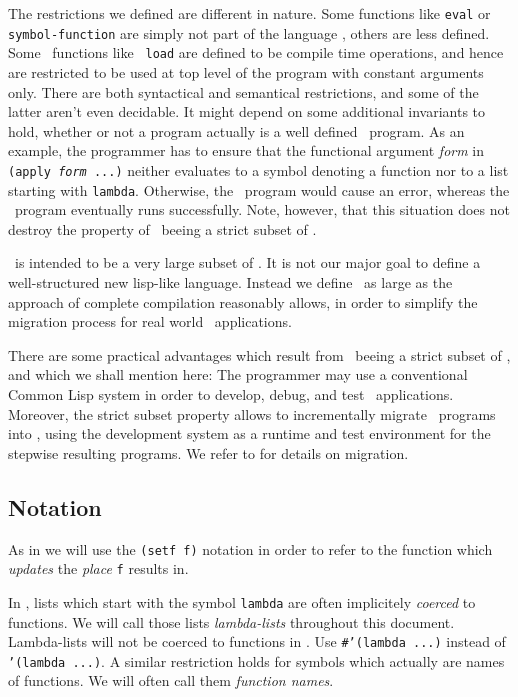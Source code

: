 The restrictions we defined are different in nature. Some functions
like {\tt eval} or {\tt symbol-function} are simply not part of the
language , others are less defined. Some \CL\ functions like {\tt
  load} are defined to be compile time operations, and hence are
restricted to be used at top level of the program with constant
arguments only. There are both syntactical and semantical
restrictions, and some of the latter aren't even decidable. It might
depend on some additional invariants to hold, whether or not a program
actually is a well defined \ program. As an example, the
programmer has to ensure that the functional argument {\it form} in
{\tt (apply {\it form} ...)} neither evaluates to a symbol denoting a
function nor to a list starting with {\tt lambda}. Otherwise, the
\ program would cause an error, whereas the \CL\ program
eventually runs successfully.  Note, however, that this situation does
not destroy the property of \ beeing a strict subset of \CL.

\ is intended to be a very large subset of \CL. It is not our
major goal to define a well-structured new lisp-like language.
Instead we define \ as large as the approach of complete
compilation reasonably allows, in order to simplify the migration
process for real world \CL\ applications.

There are some practical advantages which result from \ beeing a
strict subset of \CL, and which we shall mention here: The programmer
may use a conventional Common Lisp system in order to develop, debug,
and test \ applications. Moreover, the strict subset property
allows to incrementally migrate \CL\ programs into , using the
development system as a runtime and test environment for the stepwise
resulting programs. We refer to \cite{APPLY/CAU/IV/2} for details on
migration.

\subsection{Notation}

As in \cite{Steele90} we will use the {\tt (setf f)} notation in order
to refer to the function which {\em updates} the {\em place} {\tt f}
results in. 

In \CL, lists which start with the symbol {\tt lambda} are often 
implicitely {\em coerced} to functions. We will call those lists {\em 
lambda-lists} throughout this document. Lambda-lists will not be coerced 
to functions in . Use {\tt \#'(lambda ...)} instead of {\tt '(lambda 
...)}. A similar restriction holds for symbols which actually are names of 
functions. We will often call them {\em function names}.

